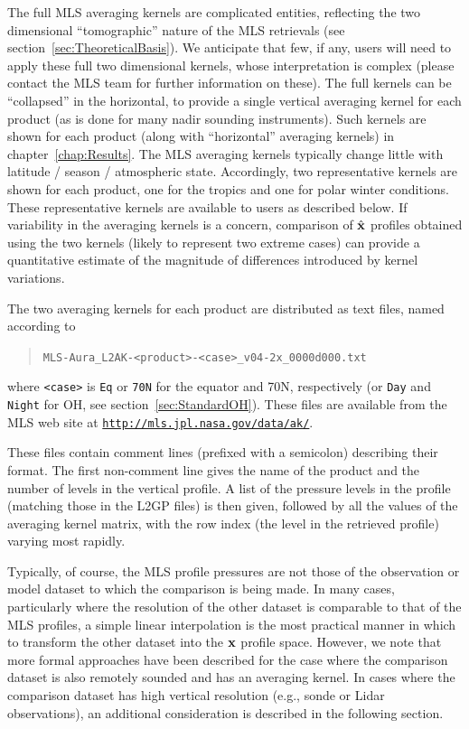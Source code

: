 \documentclass[11pt,draft]{report}
\begin{document}
The full MLS averaging kernels are complicated entities, reflecting the
two dimensional ``tomographic'' nature of the MLS retrievals (see
section~\ref{sec:TheoreticalBasis}).  We anticipate that few, if any,
users will need to apply these full two dimensional kernels, whose
interpretation is complex (please contact the MLS team for further
information on these).  The full kernels can be ``collapsed'' in the
horizontal, to provide a single vertical averaging kernel for each
product (as is done for many nadir sounding instruments).  Such kernels
are shown for each product (along with ``horizontal'' averaging kernels)
in chapter~\ref{chap:Results}.  The MLS averaging kernels typically
change little with latitude / season / atmospheric state.  Accordingly,
two representative kernels are shown for each product, one for the
tropics and one for polar winter conditions.  These representative
kernels are available to users as described below.  If variability in
the averaging kernels is a concern, comparison of $\hat{\mathbf{x}}$ profiles
obtained using the two kernels (likely to represent two extreme cases)
can provide a quantitative estimate of the magnitude of differences
introduced by kernel variations.

The two averaging kernels for each product are distributed as text
files, named according to
\begin{quote}
\verb+MLS-Aura_L2AK-<product>-<case>_v04-2x_0000d000.txt+
\end{quote}
where \verb+<case>+ is \verb+Eq+ or \verb+70N+ for the equator and
70\degsym N, respectively (or \verb+Day+ and \verb+Night+ for OH, see
section~\ref{sec:StandardOH}).  These files are available from the MLS
web site at
\href{http://mls.jpl.nasa.gov/data/ak/}{\texttt{http://mls.jpl.nasa.gov/data/ak/}}.

These files contain comment lines (prefixed with a semicolon) describing
their format.  The first non-comment line gives the name of the product
and the number of levels in the vertical profile.  A list of the
pressure levels in the profile (matching those in the L2GP files) is
then given, followed by all the values of the averaging kernel matrix,
with the row index (the level in the retrieved profile) varying most
rapidly.

Typically, of course, the MLS profile pressures are not those of the
observation or model dataset to which the comparison is being made.  In
many cases, particularly where the resolution of the other dataset is
comparable to that of the MLS profiles, a simple linear interpolation is
the most practical manner in which to transform the other dataset into
the $\mathbf{x}$ profile space.  However, we note that more formal approaches
have been described \citep{RodgersAndConnor03} for the case where the
comparison dataset is also remotely sounded and has an averaging kernel.
In cases where the comparison dataset has high vertical resolution
(e.g., sonde or Lidar observations), an additional consideration is
described in the following section.
\end{document}
